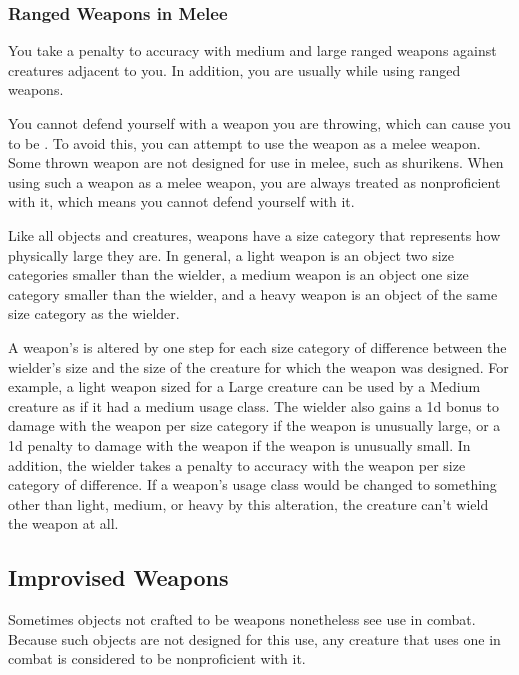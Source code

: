         \subsubsection{Ranged Weapons in Melee}

            You take a  penalty to accuracy with medium and large ranged weapons against creatures adjacent to you. In addition, you are usually  while using ranged weapons.

            \label{Thrown Weapons in Melee} You cannot defend yourself with a weapon you are throwing, which can cause you to be . To avoid this, you can attempt to use the weapon as a melee weapon. Some thrown weapon are not designed for use in melee, such as shurikens. When using such a weapon as a melee weapon, you are always treated as nonproficient with it, which means you cannot defend yourself with it.

             Like all objects and creatures, weapons have a size category that represents how physically large they are. In general, a light weapon is an object two size categories smaller than the wielder, a medium weapon is an object one size category smaller than the wielder, and a heavy weapon is an object of the same size category as the wielder.

            \label{Inappropriately Sized Weapons} A weapon's  is altered by one step for each size category of difference between the wielder's size and the size of the creature for which the weapon was designed.
            For example, a light weapon sized for a Large creature can be used by a Medium creature as if it had a medium usage class.
            The wielder also gains a \plus1d bonus to damage with the weapon per size category if the weapon is unusually large, or a \minus1d penalty to damage with the weapon if the weapon is unusually small.
            In addition, the wielder takes a  penalty to accuracy with the weapon per size category of difference.
            If a weapon's usage class would be changed to something other than light, medium, or heavy by this alteration, the creature can't wield the weapon at all.

    \subsection{Improvised Weapons}\label{Improvised Weapons} Sometimes objects not crafted to be weapons nonetheless see use in combat. Because such objects are not designed for this use, any creature that uses one in combat is considered to be nonproficient with it.


